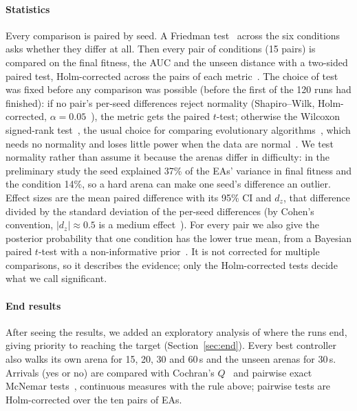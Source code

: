\documentclass[sigconf]{acmart}
\begin{document}
\paragraph{Statistics} Every comparison is paired by seed. A Friedman
test~\cite{demsar2006statistical} across the six conditions asks whether they
differ at all. Then every pair of
conditions (15 pairs) is compared on the final fitness, the AUC and the unseen
distance with a two-sided paired test, Holm-corrected across the pairs of each
metric~\cite{holm1979simple}. The choice of test was fixed before any
comparison was possible (before the first of the 120 runs had finished): if
no pair's per-seed differences reject normality (Shapiro--Wilk, Holm-corrected,
$\alpha = 0.05$~\cite{shapiro1965analysis}), the metric gets the paired
$t$-test; otherwise the Wilcoxon signed-rank test~\cite{wilcoxon1945individual},
the usual choice for comparing evolutionary
algorithms~\cite{demsar2006statistical,derrac2011practical}, which needs no
normality and loses little power when the data are
normal~\cite{hodges1956efficiency}. We test normality rather than assume it
because the arenas differ in difficulty: in the preliminary study the seed
explained 37\% of the EAs' variance in final fitness and the condition 14\%, so a
hard arena can make one seed's difference an outlier. Effect sizes are the mean
paired difference with its 95\% CI and $d_z$, that difference divided by the
standard deviation of the per-seed differences (by Cohen's convention,
$|d_z| \approx 0.5$ is a medium effect~\cite{lakens2013calculating}). For
every pair we also give the
posterior probability that one condition has the lower true mean, from a
Bayesian paired $t$-test with a non-informative prior~\cite{benavoli2017time}.
It is not corrected for multiple comparisons, so it describes the evidence;
only the Holm-corrected tests decide what we call significant.

\paragraph{End results} After seeing the results, we added an exploratory
analysis of where the runs end, giving priority to reaching the target
(Section~\ref{sec:end}). Every best controller also walks its own arena for
15, 20, 30 and 60\,s and the unseen arenas for 30\,s. Arrivals (yes or no) are
compared with Cochran's $Q$~\cite{cochran1950comparison} and pairwise exact
McNemar tests~\cite{mcnemar1947note}, continuous measures with the rule above;
pairwise tests are Holm-corrected over the ten pairs of EAs.
\end{document}
